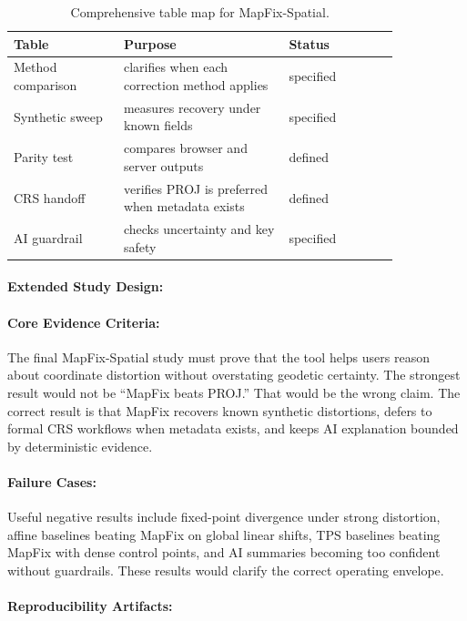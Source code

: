 \documentclass{article}
\begin{document}
\begin{table}[t]
\centering
\caption{Comprehensive table map for MapFix-Spatial.}
\begin{tabular}{@{}p{0.24\linewidth}p{0.36\linewidth}p{0.24\linewidth}@{}}
\toprule
\textbf{Table} & \textbf{Purpose} & \textbf{Status}\\
\midrule
Method comparison & clarifies when each correction method applies & specified\\
Synthetic sweep & measures recovery under known fields & specified\\
Parity test & compares browser and server outputs & defined\\
CRS handoff & verifies PROJ is preferred when metadata exists & defined\\
AI guardrail & checks uncertainty and key safety & specified\\
\bottomrule
\end{tabular}
\end{table}

\paragraph{Extended Study Design:}

\paragraph{Core Evidence Criteria:}

The final MapFix-Spatial study must prove that the tool helps users reason about coordinate distortion without overstating geodetic certainty. The strongest result would not be ``MapFix beats PROJ.'' That would be the wrong claim. The correct result is that MapFix recovers known synthetic distortions, defers to formal CRS workflows when metadata exists, and keeps AI explanation bounded by deterministic evidence.

\paragraph{Failure Cases:}

Useful negative results include fixed-point divergence under strong distortion, affine baselines beating MapFix on global linear shifts, TPS baselines beating MapFix with dense control points, and AI summaries becoming too confident without guardrails. These results would clarify the correct operating envelope.

\paragraph{Reproducibility Artifacts:}
\end{document}
